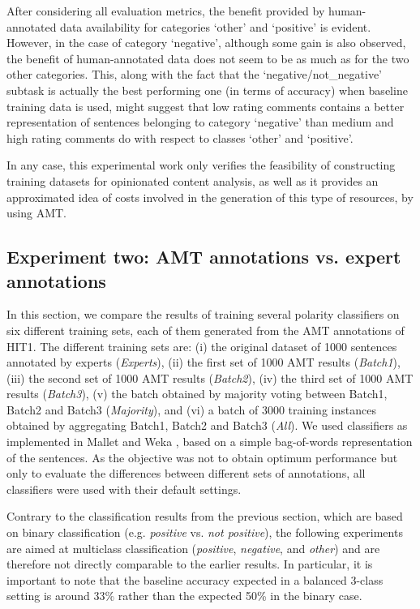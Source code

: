 \documentclass[11pt]{elsarticle}
\begin{document}
After considering all evaluation metrics, the benefit provided by human-annotated data
availability for categories `other' and `positive' is evident. However, in the case of category `negative', although some
gain is also observed, the benefit of human-annotated data does not seem to be as much as for the two other
categories. This, along with the fact that the `negative/not\_negative' subtask is actually the best performing
one (in terms of accuracy) when baseline training data is used, might suggest that low rating comments contains
a better representation of sentences belonging to category `negative' than medium and high rating comments do with
respect to classes `other' and `positive'.

In any case, this experimental work only verifies the feasibility of constructing training datasets for
opinionated content analysis, as well as it provides an approximated idea of costs involved in the generation
of this type of resources, by using AMT.


\subsection{Experiment two: AMT annotations vs. expert annotations}
\label{sect:eval2}

In this section, we compare the results of training several polarity classifiers on six different training sets, each of them generated from the AMT annotations of HIT1. The different training sets are: (i) the original dataset of 1000 sentences annotated by experts (\textit{Experts}), (ii) the first set of 1000 AMT results (\textit{Batch1}), (iii) the second set of 1000 AMT results (\textit{Batch2}), (iv) the third set of 1000 AMT results (\textit{Batch3}), (v) the batch obtained by majority voting between Batch1, Batch2 and Batch3 (\textit{Majority}), and (vi) a batch of 3000 training instances obtained by aggregating Batch1, Batch2 and Batch3 (\textit{All}). We used classifiers as implemented in Mallet \cite{mccallum} and Weka \cite{weka}, based on a simple bag-of-words representation of the sentences. As the objective was not to obtain optimum performance but only to evaluate the differences between different sets of annotations, all classifiers were used with their default settings.

Contrary to the classification results from the previous section, which are based on binary classification (e.g. \emph{positive} vs. \emph{not positive}), the following experiments are aimed at multiclass classification (\emph{positive}, \emph{negative}, and \emph{other}) and are therefore not directly comparable to the earlier results. In particular, it is important to note that the baseline accuracy expected in a balanced 3-class setting is around 33\% rather than the expected 50\% in the binary case.
\end{document}
